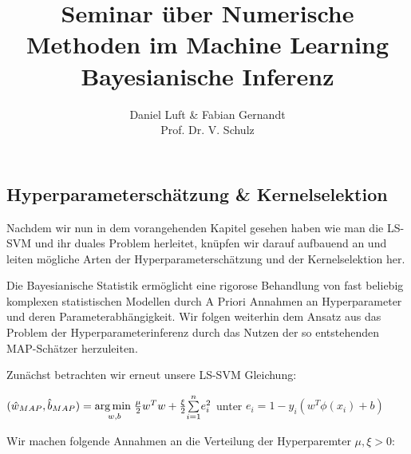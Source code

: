 \documentclass{report}
\theoremstyle{linebreak}
\begin{document}
\title{Seminar über Numerische Methoden im Machine Learning \\ Bayesianische Inferenz}

\author{Daniel Luft & Fabian Gernandt \\ Prof. Dr. V. Schulz}

{}







\subsection{Hyperparameterschätzung \& Kernelselektion}

Nachdem wir nun in dem vorangehenden Kapitel gesehen haben wie man die LS-SVM und ihr duales Problem herleitet, knüpfen wir darauf aufbauend an und leiten mögliche Arten der Hyperparameterschätzung und der Kernelselektion her. 

Die Bayesianische Statistik ermöglicht eine rigorose Behandlung von fast beliebig komplexen statistischen Modellen durch A Priori Annahmen an Hyperparameter und deren Parameterabhängigkeit. Wir folgen weiterhin dem Ansatz aus \cite{LS-SVM} das Problem der Hyperparameterinferenz durch das Nutzen der so entstehenden MAP-Schätzer herzuleiten.

Zunächst betrachten wir erneut unsere LS-SVM Gleichung:

\begin{center}
	$(\hat{w}_{MAP},\hat{b}_{MAP})  = \underset{w,b}{\arg \min \hspace{0.1cm}} 					 \frac{\mu}{2}w^Tw + \frac{\xi}{2}\underset{i=1}{\overset{n}{\sum}}e_i^2$
	unter $e_i = 1 - y_i(w^T \phi(x_i) +b)$
\end{center}

Wir machen folgende Annahmen an die Verteilung der Hyperparemter $\mu, \xi >0$:
\end{document}
